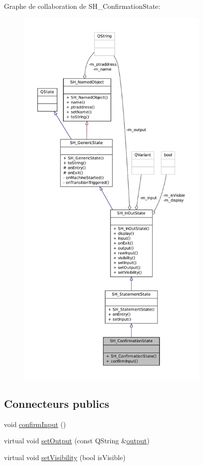 Graphe de collaboration de S\-H\-\_\-\-Confirmation\-State\-:\nopagebreak
\begin{figure}[H]
\begin{center}
\leavevmode
\includegraphics[height=550pt]{classSH__ConfirmationState__coll__graph}
\end{center}
\end{figure}
\subsection*{Connecteurs publics}
\begin{DoxyCompactItemize}
\item 
void \hyperlink{classSH__ConfirmationState_ae47d89a7fc0ada8eb51d8bef2317b348}{confirm\-Input} ()
\item 
virtual void \hyperlink{classSH__InOutState_a7dc244d72e09fdbc30eb3a704b05a4d8}{set\-Output} (const Q\-String \&\hyperlink{classSH__InOutState_a1a2fd4f34484125058e20730aaee7e46}{output})
\item 
virtual void \hyperlink{classSH__InOutState_a7706a2ea1367ab3416db27fa0f4794f7}{set\-Visibility} (bool is\-Visible)
\end{DoxyCompactItemize}
